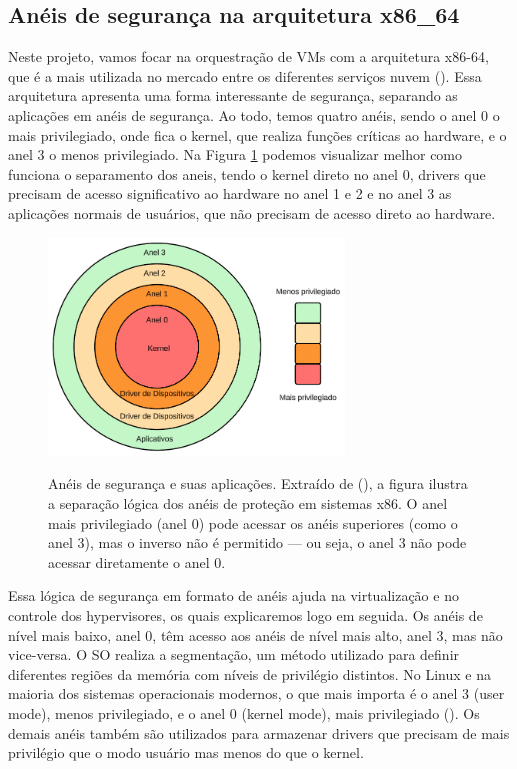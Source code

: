 \subsection{Anéis de segurança na arquitetura x86\_64}
Neste projeto, vamos focar na orquestração de VMs com a arquitetura x86-64, que é a mais utilizada no mercado entre os diferentes serviços nuvem (\cite{DataCenterCPUMarketAMDSurpassesIntelinShareGrowth}). Essa arquitetura apresenta uma forma interessante de segurança, separando as aplicações em anéis de segurança. Ao todo, temos quatro anéis, sendo o anel 0 o mais privilegiado, onde fica o kernel, que realiza funções críticas ao hardware, e o anel 3 o menos privilegiado. Na Figura \ref{fig:rings_x86} podemos visualizar melhor como funciona o separamento dos aneis, tendo o kernel direto no anel 0, drivers que precisam de acesso significativo ao hardware no anel 1 e 2 e no anel 3 as aplicações normais de usuários, que não precisam de acesso direto ao hardware.


\begin{figure}[htbp]
  \centering
  \caption{Anéis de segurança e suas aplicações. Extraído de (\cite{chirammal2016mastering}), a figura ilustra a separação lógica dos anéis de proteção em sistemas x86. O anel mais privilegiado (anel 0) pode acessar os anéis superiores (como o anel 3), mas o inverso não é permitido — ou seja, o anel 3 não pode acessar diretamente o anel 0.}
  \includegraphics[width=0.7\textwidth]{images/rings_x86.png}
  \label{fig:rings_x86}
\end{figure}

Essa lógica de segurança em formato de anéis ajuda na virtualização e no controle dos hypervisores, os quais explicaremos logo em seguida. Os anéis de nível mais baixo, anel 0, têm acesso aos anéis de nível mais alto, anel 3, mas não vice-versa. O SO realiza a segmentação, um método utilizado para definir diferentes regiões da memória com níveis de privilégio distintos. No Linux e na maioria dos sistemas operacionais modernos, o que mais importa é o anel 3 (user mode), menos privilegiado, e o anel 0 (kernel mode), mais privilegiado (\cite{modernOS}). Os demais anéis também são utilizados para armazenar drivers que precisam de mais privilégio que o modo usuário mas menos do que o kernel.

